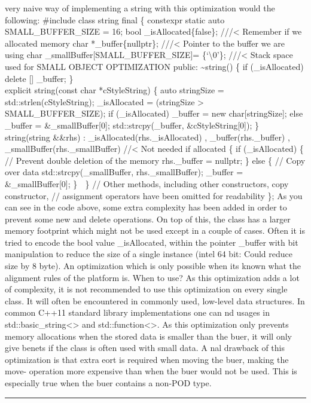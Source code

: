 very naive way of implementing a string with this optimization would the
following: \#include class string final \{ constexpr static auto
SMALL\_BUFFER\_SIZE = 16; bool \_isAllocated\{false\}; ///\textless{}
Remember if we allocated memory char *\_buffer\{nullptr\};
///\textless{} Pointer to the buffer we are using char
\_smallBuffer{[}SMALL\_BUFFER\_SIZE{]}= \{`\textbackslash0'\};
///\textless{} Stack space used for SMALL OBJECT OPTIMIZATION public:
\textasciitilde string() \{ if (\_isAllocated) delete {[}{]} \_buffer;
\}\\
explicit string(const char *cStyleString) \{ auto stringSize =
std::strlen(cStyleString); \_isAllocated = (stringSize \textgreater{}
SMALL\_BUFFER\_SIZE); if (\_isAllocated) \_buffer = new
char{[}stringSize{]}; else \_buffer = \&\_smallBuffer{[}0{]};
std::strcpy(\_buffer, \&cStyleString{[}0{]}); \} string(string \&\&rhs)
: \_isAllocated(rhs.\_isAllocated) , \_buffer(rhs.\_buffer) ,
\_smallBuffer(rhs.\_smallBuffer) //\textless{} Not needed if allocated
\{ if (\_isAllocated) \{ // Prevent double deletion of the memory
rhs.\_buffer = nullptr; \} else \{ // Copy over data
std::strcpy(\_smallBuffer, rhs.\_smallBuffer); \_buffer =
\&\_smallBuffer{[}0{]}; \}  \} // Other methods, including other
constructors, copy constructor, // assignment operators have been
omitted for readability \}; As you can see in the code above, some extra
complexity has been added in order to prevent some new and delete
operations. On top of this, the class has a larger memory footprint
which might not be used except in a couple of cases. Often it is tried
to encode the bool value \_isAllocated, within the pointer \_buffer with
bit manipulation to reduce the size of a single instance (intel 64 bit:
Could reduce size by 8 byte). An optimization which is only possible
when its known what the alignment rules of the platform is. When to use?
As this optimization adds a lot of complexity, it is not recommended to
use this optimization on every single class. It will often be
encountered in commonly used, low-level data structures. In common C++11
standard library implementations one can nd usages in
std::basic\_string\textless\textgreater{} and
std::function\textless\textgreater. As this optimization only prevents
memory allocations when the stored data is smaller than the buer, it
will only give benets if the class is often used with small data. A nal
drawback of this optimization is that extra eort is required when moving
the buer, making the move- operation more expensive than when the buer
would not be used. This is especially true when the buer contains a
non-POD type.

\begin{center}\rule{0.5\linewidth}{0.5pt}\end{center}
